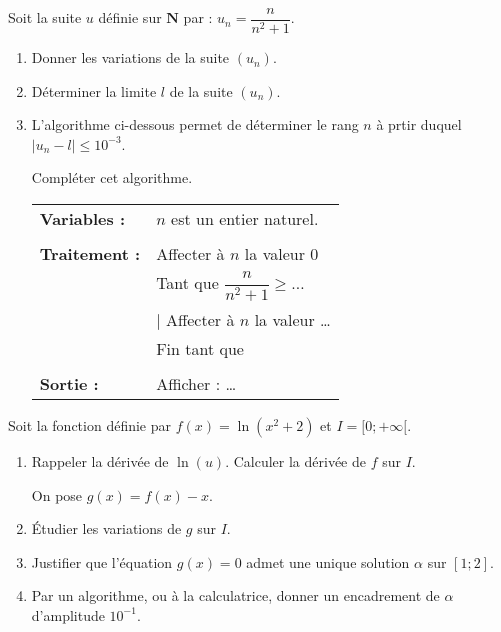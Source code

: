 \begin{question}[topic=suites]
  Soit la suite $u$ définie sur $\mathbf{N}$ par : $u_n = \dfrac{n}{n^2 +
  1}$.
  \begin{enumerate}
    \item Donner les variations de la suite $(u_n)$.
    \item Déterminer la limite $l$ de la suite $(u_n)$.
    \item L'algorithme ci-dessous permet de déterminer le rang $n$ à prtir
      duquel $\lvert u_n -l \rvert \leqslant 10^{-3}$.

      Compléter cet algorithme.

      \begin{center}
        \begin{tabular}{p{3cm}p{5cm}}
          \textbf{Variables :}  & $n$ est un entier naturel. \\
                                & \\
          \textbf{Traitement :} & Affecter à $n$ la valeur 0 \\
                                & Tant que $\dfrac{n}{n^2 + 1} \geqslant \dots$ \\
                                & \phantom{xx} $\mid$ Affecter à $n$ la valeur … \\
                                & Fin tant que \\
                                & \\
          \textbf{Sortie :}     & Afficher : … \\
        \end{tabular}
      \end{center}
  \end{enumerate}
\end{question}

\begin{question}[topic=logarithme]
  Soit la fonction définie par $f(x) = \ln(x^2 + 2)$ et $I = [ 0 ; +\infty
  [$.

  \begin{enumerate}
    \item Rappeler la dérivée de $\ln(u)$. Calculer la dérivée de $f$ sur
      $I$.

      On pose $g(x) = f(x) - x$.
    \item Étudier les variations de $g$ sur $I$.
    \item Justifier que l'équation $g(x) = 0$ admet une unique solution
      $\alpha$ sur $[1;2]$.
    \item Par un algorithme, ou à la calculatrice, donner un encadrement de
      $\alpha$ d'amplitude $10^{-1}$.
  \end{enumerate}
\end{question}

